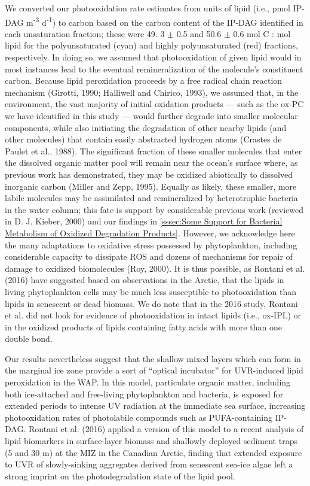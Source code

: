 We converted our photooxidation rate estimates from units of lipid (i.e., pmol IP-DAG m\textsuperscript{-3} d\textsuperscript{-1}) to carbon based on the carbon content of the IP-DAG identified in each unsaturation fraction; these were 49. 3 $\pm$ 0.5 and 50.6 $\pm$ 0.6 mol C : mol lipid for the polyunsaturated (cyan) and highly polyunsaturated (red) fractions, respectively. In doing so, we assumed that photooxidation of given lipid would in most instances lead to the eventual remineralization of the molecule's constituent carbon. Because lipid peroxidation proceeds by a free radical chain reaction mechanism (Girotti, 1990; Halliwell and Chirico, 1993), we assumed that, in the environment, the vast majority of initial oxidation products --- such as the ox-PC we have identified in this study --- would further degrade into smaller molecular components, while also initiating the degradation of other nearby lipids (and other molecules) that contain easily abstracted hydrogen atoms (Crastes de Paulet et al., 1988). The significant fraction of these smaller molecules that enter the dissolved organic matter pool will remain near the ocean's surface where, as previous work has demonstrated, they may be oxidized abiotically to dissolved inorganic carbon (Miller and Zepp, 1995). Equally as likely, these smaller, more labile molecules may be assimilated and remineralized by heterotrophic bacteria in the water column; this fate is support by considerable previous work (reviewed in D. J. Kieber, 2000) and our findings in \autoref{sssec:Some Support for Bacterial Metabolism of Oxidized Degradation Products}. However, we acknowledge here the many adaptations to oxidative stress possessed by phytoplankton, including considerable capacity to dissipate ROS and dozens of mechanisms for repair of damage to oxidized biomolecules (Roy, 2000). It is thus possible, as Rontani et al. (2016) have suggested based on observations in the Arctic, that the lipids in living phytoplankton cells may be much less susceptible to photooxidation than lipids in senescent or dead biomass. We do note that in the 2016 study, Rontani et al. did not look for evidence of photooxidation in intact lipids (i.e., ox-IPL) or in the oxidized products of lipids containing fatty acids with more than one double bond.

Our results nevertheless suggest that the shallow mixed layers which can form in the marginal ice zone provide a sort of ``optical incubator'' for UVR-induced lipid peroxidation in the WAP. In this model, particulate organic matter, including both ice-attached and free-living phytoplankton and bacteria, is exposed for extended periods to intense UV radiation at the immediate sea surface, increasing photooxidation rates of photolabile compounds such as PUFA-containing IP-DAG. Rontani et al. (2016) applied a version of this model to a recent analysis of lipid biomarkers in surface-layer biomass and shallowly deployed sediment traps (5 and 30 m) at the MIZ in the Canadian Arctic, finding that extended exposure to UVR of slowly-sinking aggregates derived from senescent sea-ice algae left a strong imprint on the photodegradation state of the lipid pool.

